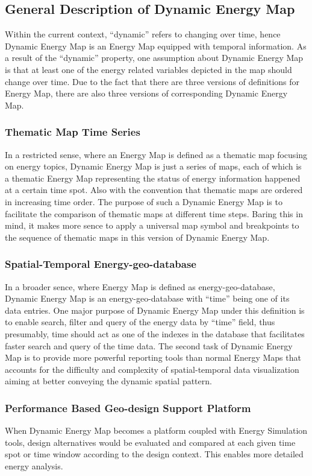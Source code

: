 \documentclass[hidelinks,12pt]{article}
\begin{document}
\subsection{General Description of Dynamic Energy Map}
Within the current context, ``dynamic'' refers to changing over time,
hence Dynamic Energy Map is an Energy Map equipped with temporal
information. As a result of the ``dynamic'' property, one assumption
about Dynamic Energy Map is that at least one of the energy related
variables depicted in the map should change over time. Due to the fact
that there are three versions of definitions for Energy Map, there are
also three versions of corresponding Dynamic Energy Map.

\subsubsection{Thematic Map Time Series}
In a restricted sense, where an Energy Map is defined as a thematic
map focusing on energy topics, Dynamic Energy Map is just a series of
maps, each of which is a thematic Energy Map representing the status
of energy information happened at a certain time spot. Also with the
convention that thematic maps are ordered in increasing time order.
The purpose of such a Dynamic Energy Map is to facilitate the
comparison of thematic maps at different time steps. Baring this in
mind, it makes more sence to apply a universal map symbol and
breakpoints to the sequence of thematic maps in this version of
Dynamic Energy Map.

\subsubsection{Spatial-Temporal Energy-geo-database}
In a broader sence, where Energy Map is defined as
energy-geo-database, Dynamic Energy Map is an energy-geo-database with
``time'' being one of its data entries. One major purpose of Dynamic
Energy Map under this definition is to enable search, filter and query
of the energy data by ``time'' field, thus presumably, time should act
as one of the indexes in the database that facilitates faster search
and query of the time data.  The second task of Dynamic Energy Map is
to provide more powerful reporting tools than normal Energy Maps that
accounts for the difficulty and complexity of spatial-temporal data
visualization aiming at better conveying the dynamic spatial
pattern.

\subsubsection{Performance Based Geo-design Support Platform}
When Dynamic Energy Map becomes a platform coupled with Energy
Simulation tools, design alternatives would be evaluated and compared
at each given time spot or time window according to the design
context. This enables more detailed energy analysis.
\newpage
\end{document}
